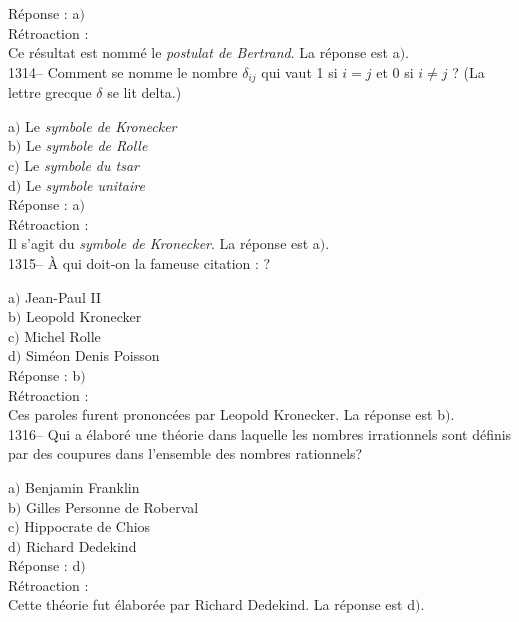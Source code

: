 ﻿\documentclass[letterpaper, 12pt]{article}
\begin{document}
R\'eponse : a$)$\\

R\'etroaction : \\
Ce r\'esultat est nomm\'e le {\sl postulat de Bertrand}.
La r\'eponse est  a$)$.\\


1314-- Comment se nomme le nombre $\delta_{ij}$ qui vaut 1 si $i=j$
et 0 si $i\not=j$ ? (La lettre grecque $\delta$ se lit delta.)

a$)$ Le {\sl symbole de Kronecker} \\
b$)$ Le {\sl symbole de Rolle} \\
c$)$ Le {\sl symbole du tsar}  \\
d$)$ Le {\sl symbole unitaire}\\

R\'eponse : a$)$\\

R\'etroaction : \\
Il s'agit du {\sl symbole de Kronecker}.
La r\'eponse est  a$)$.\\

1315-- \`A qui doit-on la fameuse citation : \fg ?

a$)$ Jean-Paul II \\
b$)$ Leopold Kronecker \\
c$)$ Michel Rolle  \\
d$)$ Sim\'eon Denis Poisson\\

R\'eponse : b$)$\\

R\'etroaction : \\
Ces paroles furent prononc\'ees par Leopold Kronecker.
La r\'eponse est  b$)$.\\

1316-- Qui a \'elabor\'e une th\'eorie dans laquelle les nombres
irrationnels sont d\'efinis par des coupures dans l'ensemble des
nombres rationnels?

a$)$ Benjamin Franklin \\
b$)$ Gilles Personne de Roberval \\
c$)$ Hippocrate de Chios \\
d$)$ Richard Dedekind\\

R\'eponse : d$)$\\

R\'etroaction : \\
Cette th\'eorie fut \'elabor\'ee par Richard Dedekind.
La r\'eponse est  d$)$.\\
\end{document}
